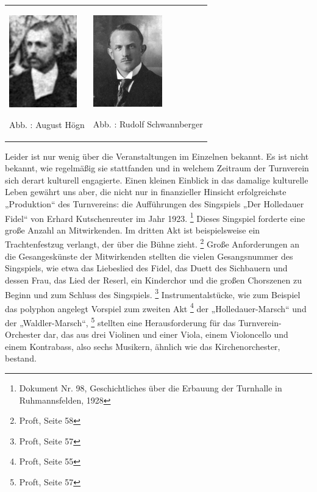 \begin{center}
\begin{minipage}{6.682cm}
\begin{flushleft}
\tablefirsthead{}
\tablehead{}
\tabletail{}
\tablelasttail{}
\begin{supertabular}{m{3.1069999cm}m{3.174cm}}

\includegraphics[width=2.925cm,height=4.001cm]{pictures/zulassungsarbeit-img019.jpg}

Abb. : August Högn &

\includegraphics[width=2.992cm,height=3.993cm]{pictures/zulassungsarbeit-img020.jpg}

Abb. : Rudolf Schwannberger\\
\end{supertabular}
\end{flushleft}
\end{minipage}
\end{center}
Leider ist nur wenig über die Veranstaltungen im Einzelnen bekannt. Es
ist nicht bekannt, wie regelmäßig sie stattfanden und in welchem
Zeitraum der Turnverein sich derart kulturell engagierte. Einen kleinen
Einblick in das damalige kulturelle Leben gewährt uns aber, die nicht
nur in finanzieller Hinsicht erfolgreichste „Produktion“ des
Turnvereins: die Aufführungen des Singspiels „Der Holledauer Fidel“ von
Erhard Kutschenreuter im Jahr 1923. \footnote{Dokument Nr. 98,
Geschichtliches über die Erbauung der Turnhalle in Ruhmannsfelden,
1928} Dieses Singspiel forderte eine große Anzahl an Mitwirkenden. Im
dritten Akt ist beispielsweise ein Trachtenfestzug verlangt, der über
die Bühne zieht. \footnote{Proft, Seite 58} Große Anforderungen an die
Gesangeskünste der Mitwirkenden stellten die vielen Gesangsnummer des
Singspiels, wie etwa das Liebeslied des Fidel, das Duett des Sichbauern
und dessen Frau, das Lied der Reserl, ein Kinderchor und die großen
Chorszenen zu Beginn und zum Schluss des Singspiels. \footnote{Proft,
Seite 57} Instrumentalstücke, wie zum Beispiel das polyphon angelegt
Vorspiel zum zweiten Akt \footnote{Proft, Seite 55} der
„Holledauer-Marsch“ und der „Waldler-Marsch“, \footnote{Proft, Seite
57} stellten eine Herausforderung für das Turnverein-Orchester dar, das
aus drei Violinen und einer Viola, einem Violoncello und einem
Kontrabass, also sechs Musikern, ähnlich wie das Kirchenorchester,
bestand.


